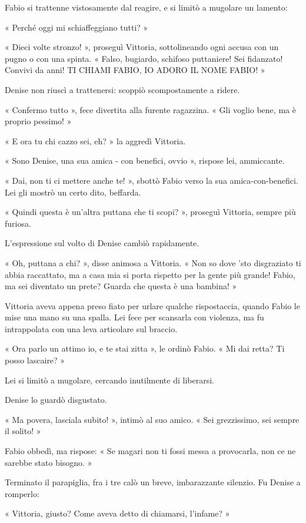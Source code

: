 Fabio si trattenne vistosamente dal reagire, e si limitò a mugolare un lamento:

« Perché oggi mi schiaffeggiano tutti? »

« Dieci volte stronzo! », proseguì Vittoria, sottolineando ogni accusa con un pugno o con una spinta. « Falso, bugiardo, schifoso puttaniere! Sei fidanzato! Convivi da anni! TI CHIAMI FABIO, IO ADORO IL NOME FABIO! »

Denise non riuscì a trattenersi: scoppiò scompostamente a ridere.

« Confermo tutto », fece divertita alla furente ragazzina. « Gli voglio bene, ma è proprio pessimo! »

« E ora tu chi cazzo sei, eh? » la aggredì Vittoria.

« Sono Denise, una sua amica - con benefici, ovvio », rispose lei, ammiccante.

« Dai, non ti ci mettere anche te! », sbottò Fabio verso la sua amica-con-benefici. Lei gli mostrò un certo dito, beffarda.

« Quindi questa è un'altra puttana che ti scopi? », proseguì Vittoria, sempre più furiosa.

L'espressione sul volto di Denise cambiò rapidamente.

« Oh, puttana a chi? », disse animosa a Vittoria. « Non so dove 'sto disgraziato ti abbia raccattato, ma a casa mia si porta rispetto per la gente più grande! Fabio, ma sei diventato un prete? Guarda che questa è una bambina! »

Vittoria aveva appena preso fiato per urlare qualche rispostaccia, quando Fabio le mise una mano su una spalla. Lei fece per scansarla con violenza, ma fu intrappolata con una leva articolare sul braccio.

« Ora parlo un attimo io, e te stai zitta », le ordinò Fabio. « Mi dai retta? Ti posso lascaire? »

Lei si limitò a mugolare, cercando inutilmente di liberarsi.

Denise lo guardò disgustato.

« Ma povera, lasciala subito! », intimò al suo amico. « Sei grezzissimo, sei sempre il solito! »

Fabio obbedì, ma rispose: « Se magari non ti fossi messa a provocarla, non ce ne sarebbe stato bisogno. »

Terminato il parapiglia, fra i tre calò un breve, imbarazzante silenzio. Fu Denise a romperlo:

« Vittoria, giusto? Come aveva detto di chiamarsi, l'infame? »

